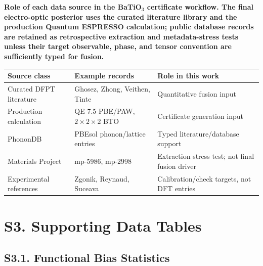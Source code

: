 ﻿\documentclass[prb,onecolumn,superscriptaddress,amsmath,amssymb,longbibliography]{revtex4-2}
\begin{document}
\begin{center}
\textbf{Role of each data source in the BaTiO$_3$ certificate workflow. The
final electro-optic posterior uses the curated literature library and the
production Quantum ESPRESSO calculation; public database records are retained
as retrospective extraction and metadata-stress tests unless their target
observable, phase, and tensor convention are sufficiently typed for fusion.}\\[0.5em]
\begin{tabular}{lll}
\toprule
Source class & Example records & Role in this work \\
\midrule
Curated DFPT literature & Ghosez, Zhong, Veithen, Tinte & Quantitative fusion input \\
Production calculation & QE 7.5 PBE/PAW, $2\times2\times2$ BTO & Certificate generation input \\
PhononDB & PBEsol phonon/lattice entries & Typed literature/database support \\
Materials Project & mp-5986, mp-2998 & Extraction stress test; not final fusion driver \\
Experimental references & Zgonik, Reynaud, Suceava & Calibration/check targets, not DFT entries \\
\bottomrule
\end{tabular}
\end{center}


\section{S3. Supporting Data Tables}
\label{sec:si_tables}

\subsection{S3.1. Functional Bias Statistics}
\end{document}
